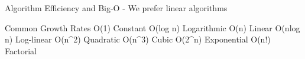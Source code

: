 Algorithm Efficiency and Big-O
    - We prefer linear algorithms


Common Growth Rates
    O(1)        Constant
    O(log n)    Logarithmic
    O(n)        Linear
    O(nlog n)   Log-linear
    O(n^2)      Quadratic
    O(n^3)      Cubic
    O(2^n)      Exponential
    O(n!)       Factorial